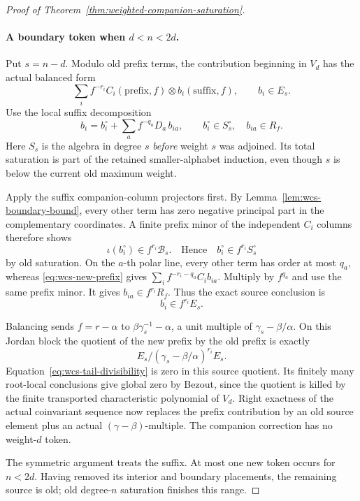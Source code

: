 \documentclass[11pt]{article}
\theoremstyle{definition}\newtheorem{definition}[theorem]{Definition}
\begin{document}
\begin{proof}[Proof of Theorem~\ref{thm:weighted-companion-saturation}]
\paragraph{A boundary token when \(d<n<2d\).}
Put \(s=n-d\).  Modulo old prefix terms, the contribution
beginning in \(V_d\) has the actual balanced form
\begin{equation}\label{eq:wcs-new-prefix}
 \sum_i f^{-r_i}C_i(\text{prefix},f)
                       \otimes b_i(\text{suffix},f),
 \qquad b_i\in E_s .
\end{equation}
Use the local suffix decomposition
\[
 b_i=b_i^\circ+\sum_a f^{-q_a}D_a\,b_{ia},
 \qquad b_i^\circ\in S_s^\circ,\quad b_{ia}\in R_f.
\]
Here \(S_s\) is the algebra in degree \(s\) \emph{before}
weight \(s\) was adjoined.  Its total saturation is part of
the retained smaller-alphabet induction, even though
\(s\) is below the current old maximum weight.

Apply the suffix companion-column projectors first.
By Lemma~\ref{lem:wcs-boundary-bound}, every other term
has zero negative principal part in the complementary
coordinates.  A finite prefix minor of the independent
\(C_i\) columns therefore shows
\[
 \iota(b_i^\circ)\in f^{r_i}\mathcal B_s.
 \quad\text{Hence}\quad b_i^\circ\in f^{r_i}S_s^\circ
\]
by old saturation.  On the \(a\)-th polar line, every
other term has order at most \(q_a\), whereas
\eqref{eq:wcs-new-prefix} gives
\(\sum_i f^{-r_i-q_a}C_i b_{ia}\).  Multiply by \(f^{q_a}\)
and use the same prefix minor.  It gives
\(b_{ia}\in f^{r_i}R_f\).  Thus the exact source conclusion is
\begin{equation}\label{eq:wcs-tail-divisibility}
                         b_i\in f^{r_i}E_s .
\end{equation}

Balancing sends \(f=r-\alpha\) to
\(\beta\gamma_s^{-1}-\alpha\), a unit multiple of
\(\gamma_s-\beta/\alpha\).  On this Jordan block the
quotient of the new prefix by the old prefix is exactly
\[
 E_s/(\gamma_s-\beta/\alpha)^{r_i}E_s .
 \]
Equation~\eqref{eq:wcs-tail-divisibility} is zero in this
source quotient.  Its finitely many root-local conclusions
give global zero by Bezout, since the quotient is killed by
the finite transported characteristic polynomial of \(V_d\).
Right exactness of the actual coinvariant sequence now
replaces the prefix contribution by an old source element
plus an actual \((\gamma-\beta)\)-multiple.  The companion
correction has no weight-\(d\) token.

The symmetric argument treats the suffix.  At most one
new token occurs for \(n<2d\).  Having removed its interior
and boundary placements, the remaining source is old;
old degree-\(n\) saturation finishes this range.


\end{proof}
\end{document}
